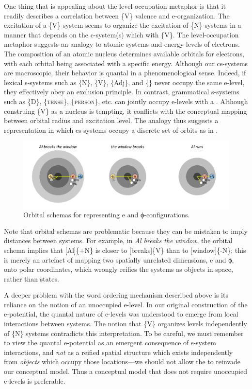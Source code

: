   One thing that is appealing about the level-occupation metaphor is that it readily describes a correlation between \{V\} valence and e-organization. The excitation of a \{V\} system seems to organize the excitation of \{N\} systems in a manner that depends on the c-system(s) which  with \{V\}. The level-occupation metaphor suggests an analogy to atomic systems and energy levels of electrons. The composition of an atomic nucleus determines available orbitals for electrons, with each orbital being associated with a specific energy. Although our cs-systems are macroscopic, their behavior is quantal in a phenomenological sense. Indeed, if lexical s-systems such as \{N\}, \{V\}, \{Adj\}, and \{\} never occupy the same e-level, they effectively obey an exclusion principle. In contrast, grammatical s-systems such as \{D\}, \{\textsc{tense}\}, \{\textsc{person}\}, etc. can jointly occupy e-levels with a . Although construing \{V\} as a nucleus is tempting, it conflicts with the conceptual mapping between orbital radius and excitation level. The analogy thus suggests a representation in which cs-systems occupy a discrete set of orbits as in {}.

  
\begin{figure}
\includegraphics[width=\textwidth]{figures/Tilsen-img76.png}
\caption{Orbital schemas for representing e and ϕ-configurations.}
\label{fig:4:26}
\end{figure}
 

  Note that orbital schemas are problematic because they can be mistaken to imply distances between systems. For example, in \textit{Al breaks the window}, the orbital schema implies that [Al]\{+N\} is closer to [breaks]\{V\} than to [window]\{-N\}; this is merely an artefact of mapping two spatially unrelated dimensions, e and ϕ, onto polar coordinates, which wrongly reifies the systems as objects in space, rather than states.

  A deeper problem with the word ordering mechanism described above is its reliance on the notion of an unoccupied e-level. In our original construction of the e-potential, the quantal nature of e-levels was understood to emerge from local interactions between systems. The notion that \{V\} organizes levels independently of \{N\} systems contradicts this interpretation. To be careful, we must remember to view the quantal e-potential as an emergent consequence of s-system interactions, and \textit{not} as a reified spatial structure which exists independently from \textit{objects} which occupy those locations—we should not allow the  to reinvade our conceptual model. Thus a conceptual model that does not require unoccupied e-levels is preferable.

